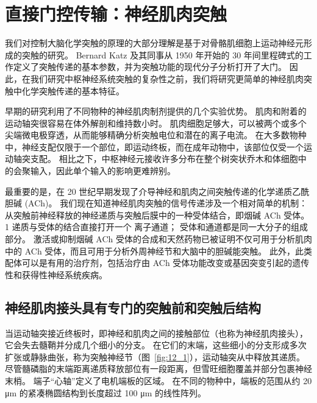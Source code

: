 \chapter{直接门控传输：神经肌肉突触} \label{chap:chap12}

我们对控制大脑化学突触的原理的大部分理解是基于对骨骼肌细胞上运动神经元形成的突触的研究。
Bernard Katz 及其同事从 1950 年开始的 30 年间里程碑式的工作定义了突触传递的基本参数，并为突触功能的现代分子分析打开了大门。
因此，在我们研究中枢神经系统突触的复杂性之前，我们将研究更简单的神经肌肉突触中化学突触传递的基本特征。


早期的研究利用了不同物种的神经肌肉制剂提供的几个实验优势。
肌肉和附着的运动轴突很容易在体外解剖和维持数小时。 
肌肉细胞足够大，可以被两个或多个尖端微电极穿透，从而能够精确分析突触电位和潜在的离子电流。
在大多数物种中，神经支配仅限于一个部位，即运动终板，而在成年动物中，该部位仅受一个运动轴突支配。
相比之下，中枢神经元接收许多分布在整个树突状乔木和体细胞中的会聚输入，因此单个输入的影响更难辨别。


最重要的是，在 20 世纪早期发现了介导神经和肌肉之间突触传递的化学递质乙酰胆碱 (ACh)。
我们现在知道神经肌肉突触的信号传递涉及一个相对简单的机制：从突触前神经释放的神经递质与突触后膜中的一种受体结合，即烟碱 ACh 受体。
1 递质与受体的结合直接打开一个 离子通道；
受体和通道都是同一大分子的组成部分。
激活或抑制烟碱 ACh 受体的合成和天然药物已被证明不仅可用于分析肌肉中的 ACh 受体，而且可用于分析外周神经节和大脑中的胆碱能突触。
此外，此类配体可以是有用的治疗剂，包括治疗由 ACh 受体功能改变或基因突变引起的遗传性和获得性神经系统疾病。



\section{神经肌肉接头具有专门的突触前和突触后结构}

当运动轴突接近终板时，即神经和肌肉之间的接触部位（也称为神经肌肉接头），它会失去髓鞘并分成几个细小的分支。
在它们的末端，这些细小的分支形成多次扩张或静脉曲张，称为突触神经节（图~\ref{fig:12_1}），运动轴突从中释放其递质。
尽管髓磷脂的末端距离递质释放部位有一段距离，但雪旺细胞覆盖并部分包裹神经末梢。
端子“心轴”定义了电机端板的区域。
在不同的物种中，端板的范围从约 20 μm 的紧凑椭圆结构到长度超过 100 μm 的线性阵列。


